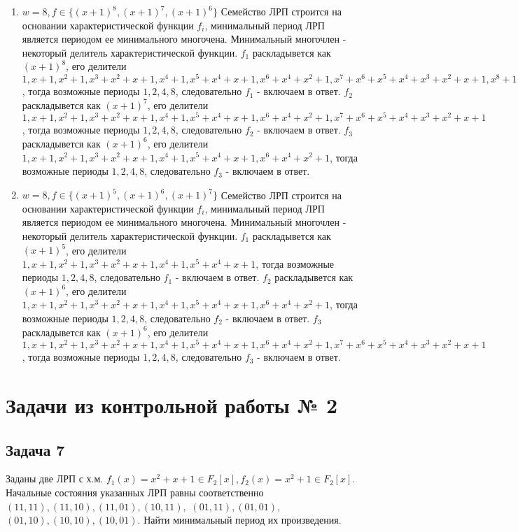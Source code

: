 \documentclass[utf8x, 14pt]{G7-32} %
\begin{document}
\begin{enumerate}
    \item $w=8, f\in \{(x+1)^8, (x+1)^7, (x+1)^6\}$
    Семейство ЛРП строится на основании характеристической функции $f_i$, минимальный период ЛРП является периодом ее минимального многочена. Минимальный многочлен - некоторый делитель характеристической функции. $f_1$ раскладывется как $(x+1)^8$, его делители $1, x+1, x^2+1, x^3+x^2+x+1, x^4+1, x^5+x^4+x+1, x^6+x^4+x^2+1, x^7+x^6+x^5+x^4+x^3+x^2+x+1, x^8+1$, тогда возможные периоды $1, 2, 4, 8$, следовательно $f_1$ - включаем в ответ. $f_2$ раскладывется как $(x+1)^7$, его делители $1, x+1, x^2+1, x^3+x^2+x+1, x^4+1, x^5+x^4+x+1, x^6+x^4+x^2+1, x^7+x^6+x^5+x^4+x^3+x^2+x+1$, тогда возможные периоды $1, 2, 4, 8$, следовательно $f_2$ - включаем в ответ. $f_3$ раскладывется как $(x+1)^6$, его делители $1, x+1, x^2+1, x^3+x^2+x+1, x^4+1, x^5+x^4+x+1, x^6+x^4+x^2+1$, тогда возможные периоды $1, 2, 4, 8$, следовательно $f_3$ - включаем в ответ.
    
    \item $w=8, f\in \{(x+1)^5, (x+1)^6, (x+1)^7\}$
    Семейство ЛРП строится на основании характеристической функции $f_i$, минимальный период ЛРП является периодом ее минимального многочена. Минимальный многочлен - некоторый делитель характеристической функции. $f_1$ раскладывется как $(x+1)^5$, его делители $1, x+1, x^2+1, x^3+x^2+x+1, x^4+1, x^5+x^4+x+1$, тогда возможные периоды $1, 2, 4, 8$, следовательно $f_1$ - включаем в ответ. $f_2$ раскладывется как $(x+1)^6$, его делители $1, x+1, x^2+1, x^3+x^2+x+1, x^4+1, x^5+x^4+x+1, x^6+x^4+x^2+1$, тогда возможные периоды $1, 2, 4, 8$, следовательно $f_2$ - включаем в ответ. $f_3$ раскладывется как $(x+1)^6$, его делители $1, x+1, x^2+1, x^3+x^2+x+1, x^4+1, x^5+x^4+x+1, x^6+x^4+x^2+1, x^7+x^6+x^5+x^4+x^3+x^2+x+1$, тогда возможные периоды $1, 2, 4, 8$, следовательно $f_3$ - включаем в ответ.
\end{enumerate}
\section{Задачи из контрольной работы № 2}
\subsection{Задача 7}
Заданы две ЛРП с х.м. $f_1(x)=x^2+x+1 \in F_2[x], f_2(x)=x^2+1\in F_2[x]$. Начальные состояния указанных ЛРП равны соответственно $ (11, 11), (11, 10), (11, 01), (10, 11),$ $ (01, 11), (01, 01), $ $(01, 10), (10, 10), (10, 01) $. Найти минимальный период их произведения.
\end{document}
